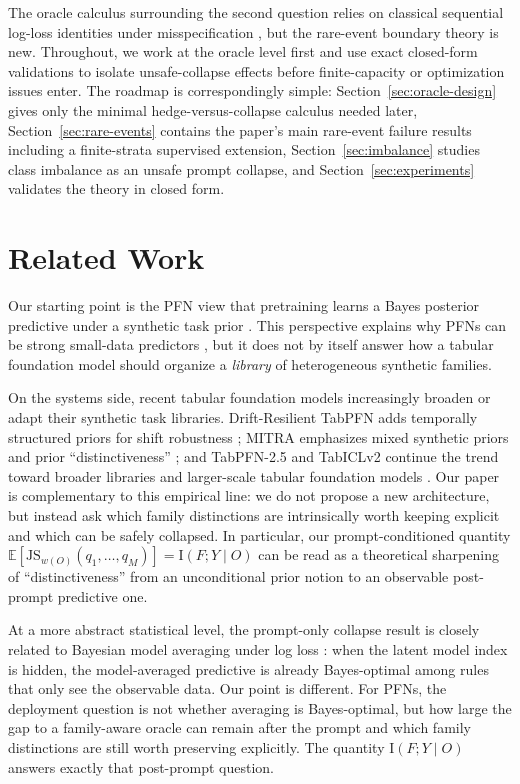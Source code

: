 \documentclass{article}
\theoremstyle{definition}
\theoremstyle{remark}
\newcommand{\E}{\mathbb{E}}
\newcommand{\I}{\mathrm{I}}
\newcommand{\JS}{\mathrm{JS}}
\begin{document}
The oracle calculus surrounding the second question relies on classical sequential log-loss identities under misspecification \citep{clarke1990,amari1993,feder2021,morningstar2022,margossian2024,agrawal2025}, but the rare-event boundary theory is new. Throughout, we work at the oracle level first and use exact closed-form validations to isolate unsafe-collapse effects before finite-capacity or optimization issues enter. The roadmap is correspondingly simple: Section~\ref{sec:oracle-design} gives only the minimal hedge-versus-collapse calculus needed later, Section~\ref{sec:rare-events} contains the paper's main rare-event failure results including a finite-strata supervised extension, Section~\ref{sec:imbalance} studies class imbalance as an unsafe prompt collapse, and Section~\ref{sec:experiments} validates the theory in closed form.

\section{Related Work}
\label{sec:related}

Our starting point is the PFN view that pretraining learns a Bayes posterior predictive under a synthetic task prior \citep{muller2022,nagler2023,muller2025position}. This perspective explains why PFNs can be strong small-data predictors \citep{hollmann2025}, but it does not by itself answer how a tabular foundation model should organize a \emph{library} of heterogeneous synthetic families.

On the systems side, recent tabular foundation models increasingly broaden or adapt their synthetic task libraries. Drift-Resilient TabPFN adds temporally structured priors for shift robustness \citep{helli2024}; MITRA emphasizes mixed synthetic priors and prior ``distinctiveness'' \citep{zhang2025}; and TabPFN-2.5 and TabICLv2 continue the trend toward broader libraries and larger-scale tabular foundation models \citep{grinsztajn2025tabpfn25,qu2026tabiclv2}. Our paper is complementary to this empirical line: we do not propose a new architecture, but instead ask which family distinctions are intrinsically worth keeping explicit and which can be safely collapsed. In particular, our prompt-conditioned quantity $\E[\JS_{w(O)}(q_1,\dots,q_M)] = \I(F;Y\mid O)$ can be read as a theoretical sharpening of ``distinctiveness'' from an unconditional prior notion to an observable post-prompt predictive one.

At a more abstract statistical level, the prompt-only collapse result is closely related to Bayesian model averaging under log loss \citep{hoeting1999}: when the latent model index is hidden, the model-averaged predictive is already Bayes-optimal among rules that only see the observable data. Our point is different. For PFNs, the deployment question is not whether averaging is Bayes-optimal, but how large the gap to a family-aware oracle can remain after the prompt and which family distinctions are still worth preserving explicitly. The quantity $\I(F;Y\mid O)$ answers exactly that post-prompt question.
\end{document}
